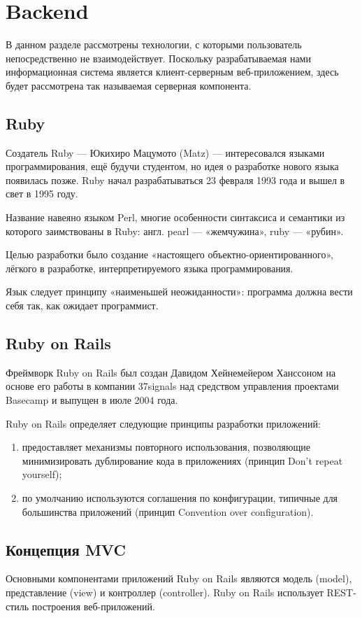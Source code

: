 \section{Backend}
В данном разделе рассмотрены технологии, с которыми пользователь непосредственно
не взаимодействует. Поскольку разрабатываемая нами информационная система
является клиент-серверным веб-приложением, здесь будет рассмотрена так
называемая серверная компонента.

\subsection{Ruby}
Создатель Ruby — Юкихиро Мацумото (Matz) — интересовался языками
программирования, ещё будучи студентом, но идея о разработке нового языка
появилась позже. Ruby начал разрабатываться 23 февраля 1993 года и вышел в свет
в 1995 году.

Название навеяно языком Perl, многие особенности синтаксиса и семантики из
которого заимствованы в Ruby: англ. pearl — «жемчужина», ruby — «рубин».

Целью разработки было создание «настоящего объектно-ориентированного», лёгкого в
разработке, интерпретируемого языка программирования.

Язык следует принципу «наименьшей неожиданности»: программа должна вести себя
так, как ожидает программист.

\subsection{Ruby on Rails}
Фреймворк Ruby on Rails был создан Давидом Хейнемейером Ханссоном на основе его
работы в компании 37signals над средством управления проектами Basecamp и
выпущен в июле 2004 года.

Ruby on Rails определяет следующие принципы разработки приложений:

\begin{enumerate}
  \item предоставляет механизмы повторного использования, 
позволяющие минимизировать дублирование кода в приложениях (принцип Don’t repeat yourself);
  \item по умолчанию используются соглашения по конфигурации, типичные для
большинства приложений (принцип Convention over configuration).
\end{enumerate}

\subsection{Концепция MVC}
Основными компонентами приложений Ruby on Rails являются модель (model),
представление (view) и контроллер (controller). Ruby on Rails использует
REST-стиль построения веб-приложений.

